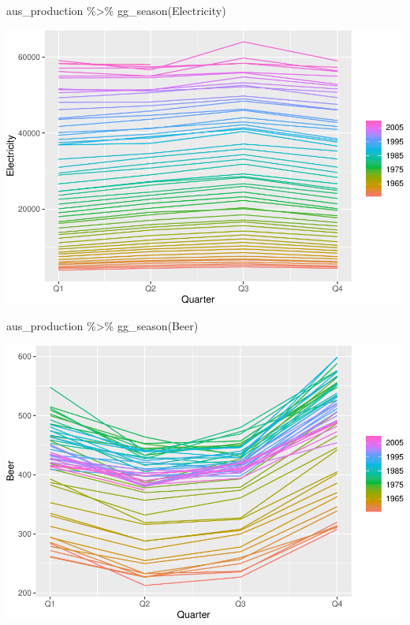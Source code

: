 \documentclass[
]{book}
\newenvironment{Shaded}{\begin{snugshade}}{\end{snugshade}}
\newcommand{\FunctionTok}[1]{\textcolor[rgb]{0.00,0.00,0.00}{#1}}
\newcommand{\NormalTok}[1]{#1}
\newcommand{\SpecialCharTok}[1]{\textcolor[rgb]{0.00,0.00,0.00}{#1}}
\begin{document}
\begin{Shaded}
\begin{Highlighting}[]
\NormalTok{aus\_production }\SpecialCharTok{\%\textgreater{}\%} \FunctionTok{gg\_season}\NormalTok{(Electricity)}
\end{Highlighting}
\end{Shaded}

\includegraphics{graphics/unnamed-chunk-17-1.pdf}

\begin{Shaded}
\begin{Highlighting}[]
\NormalTok{aus\_production }\SpecialCharTok{\%\textgreater{}\%} \FunctionTok{gg\_season}\NormalTok{(Beer)}
\end{Highlighting}
\end{Shaded}

\includegraphics{graphics/unnamed-chunk-17-2.pdf}
\end{document}
